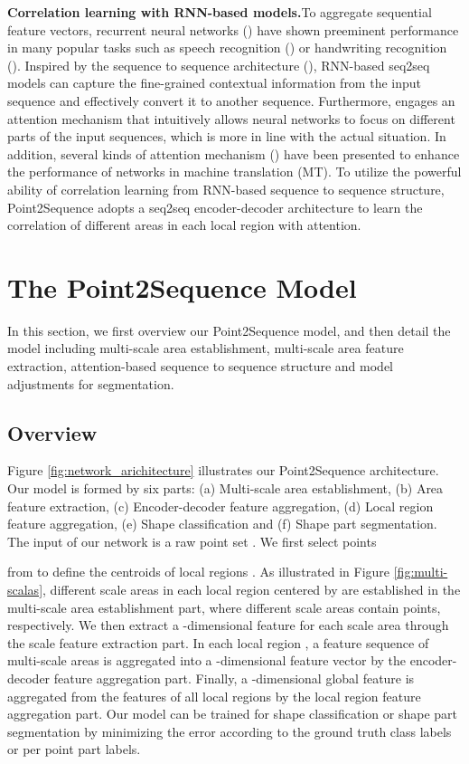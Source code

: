 \documentclass[letterpaper]{article}
\begin{document}
\noindent
\newline
\textbf{Correlation learning with RNN-based models.}\quad To aggregate sequential feature vectors, recurrent neural networks (\citealt{elman1990finding}) have shown preeminent performance in many popular tasks such as speech recognition (\citealt{li2015constructing}) or  handwriting recognition (\citealt{bertolami2009novel}).
Inspired by the sequence to sequence architecture (\citealt{cho2014learning}), RNN-based seq2seq models can capture the fine-grained contextual information from the input sequence and effectively convert it to another sequence.
Furthermore, \citet{sutskever2014sequence} engages an attention mechanism that intuitively allows neural networks to focus on different parts of the input sequences, which is more in line with the actual situation.
In addition, several kinds of attention mechanism (\citealt{bahdanau2014neural,luong2015effective}) have been presented to enhance the performance of networks in machine translation (MT). 
To utilize the powerful ability of correlation learning from RNN-based sequence to sequence structure, Point2Sequence adopts a seq2seq encoder-decoder architecture to learn the correlation of different areas in each local region with attention. 


\section{The Point2Sequence Model}
In this section, we first overview our Point2Sequence model, and then detail the model including multi-scale area establishment, multi-scale area feature extraction, attention-based sequence to sequence structure and model adjustments for segmentation. 
\subsection{Overview}
Figure \ref{fig:network_arichitecture} illustrates our Point2Sequence architecture. Our model is  formed by six parts: (a) Multi-scale area establishment, (b) Area feature extraction, (c) Encoder-decoder feature aggregation, (d) Local region feature aggregation, (e) Shape classification and (f) Shape part segmentation.
The input of our network is a raw point set .
We first select  points 

from  to define the centroids of local regions .
As illustrated in Figure \ref{fig:multi-scalas},  different scale areas  in each local region  centered by  are established in the multi-scale area establishment part, where  different scale areas contain  points, respectively.
We then extract a -dimensional feature  for each scale area   through the scale feature extraction part.
In each local region , a feature sequence  of multi-scale areas is aggregated into a -dimensional feature vector  by the encoder-decoder feature aggregation part.
Finally, a -dimensional global feature  is aggregated from the features  of all local regions by the local region feature aggregation part.
Our model can be trained for shape classification or shape part segmentation by minimizing the error according to the ground truth class labels or per point part labels.  
\end{document}
